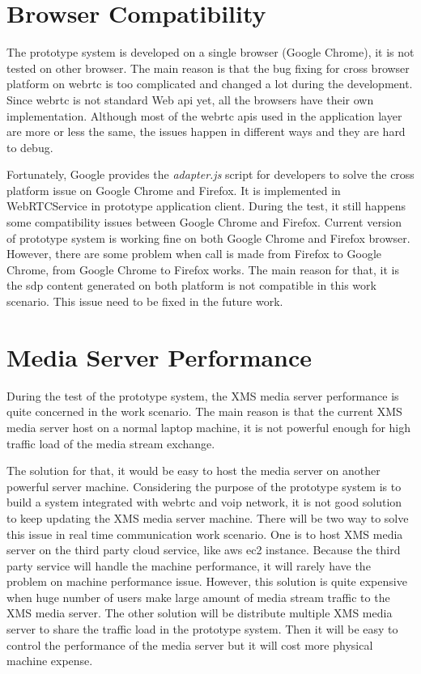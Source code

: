 \section{Browser Compatibility}

\par The prototype system is developed on a single browser (Google Chrome), it is not tested on other browser. The main reason is that the bug fixing for cross browser platform on \gls{webrtc} is too complicated and changed a lot during the development. Since \gls{webrtc} is not standard Web \gls{api} yet, all the browsers have their own implementation. Although most of the \gls{webrtc} \gls{api}s used in the application layer are more or less the same, the issues happen in different ways and they are hard to debug.

\par Fortunately, Google provides the \textit{adapter.js} script for developers to solve the cross platform issue on Google Chrome and Firefox. It is implemented in WebRTCService in prototype application client. During the test, it still happens some compatibility issues between Google Chrome and Firefox. Current version of prototype system is working fine on both Google Chrome and Firefox browser. However, there are some problem when call is made from Firefox to Google Chrome, from Google Chrome to Firefox works. The main reason for that, it is the \gls{sdp} content generated on both platform is not compatible in this work scenario. This issue need to be fixed in the future work.

\section{Media Server Performance}

\par During the test of the prototype system, the XMS media server performance is quite concerned in the work scenario. The main reason is that the current XMS media server host on a normal laptop machine, it is not powerful enough for high traffic load of the media stream exchange.

\par The solution for that, it would be easy to host the media server on another powerful server machine. Considering the purpose of the prototype system is to build a system integrated with \gls{webrtc} and \gls{voip} network, it is not good solution to keep updating the XMS media server machine. There will be two way to solve this issue in real time communication work scenario. One is to host XMS media server on the third party cloud service, like \gls{aws} \gls{ec2} instance. Because the third party service will handle the machine performance, it will rarely have the problem on machine performance issue. However, this solution is quite expensive when huge number of users make large amount of media stream traffic to the XMS media server. The other solution will be distribute multiple XMS media server to share the traffic load in the prototype system. Then it will be easy to control the performance of the media server but it will cost more physical machine expense.

